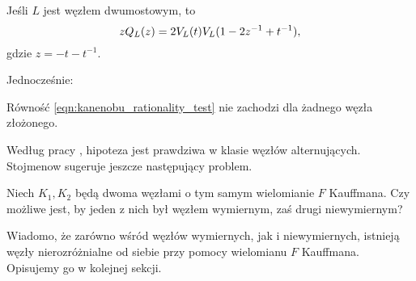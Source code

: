 \begin{proposition}
    Jeśli $L$ jest węzłem dwumostowym, to
    \begin{equation}
\label{eqn:kanenobu_rationality_test}%
        z Q_L(z) = 2 \jones_L(t) \jones_L (1-2z^{-1}+t^{-1}),
    \end{equation}
    gdzie $z = -t - t^{-1}$.
\end{proposition}

Jednocześnie:

\begin{conjecture}
%
    Równość \ref{eqn:kanenobu_rationality_test} nie zachodzi dla żadnego węzła złożonego.
\end{conjecture}

Według pracy \cite{stoimenow00}, hipoteza jest prawdziwa w klasie węzłów alternujących.
Stojmenow sugeruje jeszcze następujący problem.
%

\begin{conjecture}
    Niech $K_1, K_2$ będą dwoma węzłami o tym samym wielomianie $F$ Kauffmana.
    Czy możliwe jest, by jeden z nich był węzłem wymiernym, zaś drugi niewymiernym?
\end{conjecture}

Wiadomo, że zarówno wśród węzłów wymiernych, jak i niewymiernych, istnieją węzły nierozróżnialne od siebie przy pomocy wielomianu $F$ Kauffmana.
Opisujemy go w kolejnej sekcji.

%


